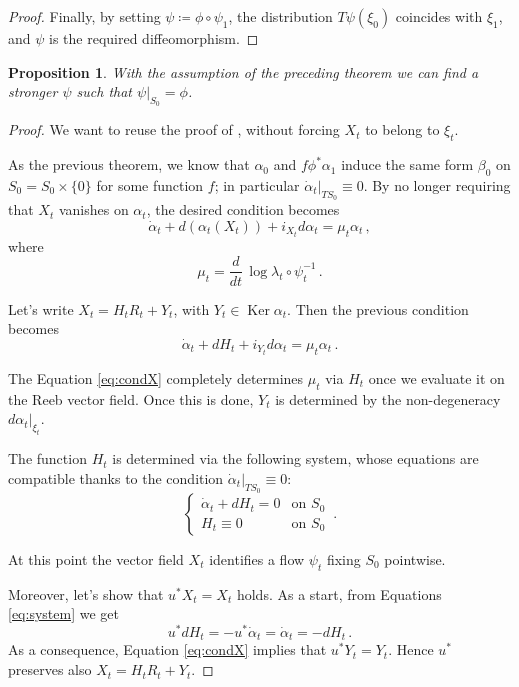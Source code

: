 \documentclass[a4paper, 11pt]{amsart}
\theoremstyle{plain}
\newtheorem{prop}{Proposition}[section]
\theoremstyle{definition}
\DeclareMathOperator{\Ker}{Ker}
\begin{document}
\begin{proof}
	Finally, by setting $\psi \coloneqq \phi \circ \psi_1$, the distribution $T\psi(\xi_0)$ coincides with $\xi_1$, and $\psi$ is the required diffeomorphism.
\end{proof}
\begin{prop}\label{Girouxbound}
	With the assumption of the preceding theorem we can find a stronger $\psi$ such that $\psi|_{S_0} = \phi$.
\end{prop}
\begin{proof}
	We want to reuse the proof of , without forcing $X_t$ to belong to $\xi_t$.
	
	As the previous theorem, we know that $\alpha_0$ and $f\phi^*\alpha_1$ induce the same form $\beta_0$ on $S_0 = S_0 \times \{0\}$ for some function $f$; in particular $\dot{\alpha}_t|_{TS_0} \equiv 0$. By no longer requiring that $X_t$ vanishes on $\alpha_t$, the desired condition becomes 
	\[
		\dot{\alpha}_t + d(\alpha_t(X_t)) + i_{X_t}d\alpha_t = \mu_t\alpha_t\,,
	\]
	where
	\[
	\mu_t = \frac{d}{dt}\,\log \lambda_t \circ \psi_t^{-1}\,.
	\]
	
	Let's write $X_t = H_tR_t + Y_t$, with $Y_t \in \Ker \alpha_t$. Then the previous condition becomes 
	\begin{equation}\label{eq:condX}
		\dot{\alpha}_t + dH_t + i_{Y_t} d\alpha_t = \mu_t\alpha_t\,.
	\end{equation}
	
	The Equation \eqref{eq:condX} completely determines $\mu_t$ via $H_t$ once we evaluate it on the Reeb vector field. Once this is done, $Y_t$ is determined by the non-degeneracy $d\alpha_t|_{\xi_t}$.
	
	The function $H_t$ is determined via the following system, whose equations are compatible thanks to the condition $\dot{\alpha}_t|_{TS_0} \equiv 0$:
	\begin{equation}\label{eq:system}
		\begin{cases}
			\dot{\alpha}_t + dH_t = 0 & \text{on $S_0$}\\
			H_t \equiv 0 & \text{on $S_0$}
		\end{cases}\,.
	\end{equation}
	
	At this point the vector field $X_t$ identifies a flow $\psi_t$ fixing $S_0$ pointwise.
	
	Moreover, let's show that $u^*X_t = X_t$ holds. As a start, from Equations \eqref{eq:system} we get 
	\[
	u^*dH_t = -u^*\dot{\alpha}_t =  \dot{\alpha}_t =- dH_t\,.
	\]
	As a consequence, Equation \eqref{eq:condX} implies that $u^*Y_t = Y_t$. Hence $u^*$ preserves also $X_t = H_tR_t + Y_t$.
\end{proof}
\end{document}
